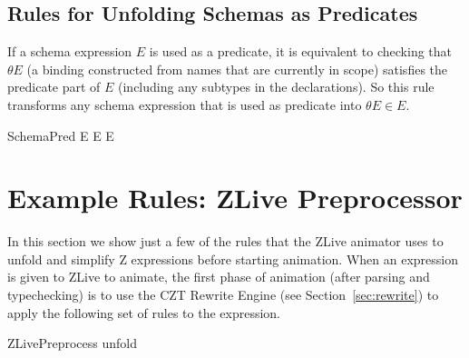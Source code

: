 \documentclass{entcs}
\newcommand{\sexprUnfoldsTo}{\mathrel{=_{se}}}
\newcommand{\schemaEquals}{\mathrel{=_S}}
\begin{document}
%


\subsection{Rules for Unfolding Schemas as Predicates}

If a schema expression $E$ is used as a predicate, it is equivalent to
checking that $\theta E$ (a binding constructed from names that are
currently in scope) satisfies the predicate part of $E$ (including any
subtypes in the declarations).  So this rule transforms any schema
expression that is used as predicate into $\theta E \in E$.
\begin{zedrule}{SchemaPred}
  E \iff \theta E \in E
\end{zedrule}

\section{Example Rules: ZLive Preprocessor} \label{sec:zlive}

In this section we show just a few of the rules that the ZLive
animator uses to unfold and simplify Z expressions before starting
animation.  When an expression is given to ZLive to animate, the first
phase of animation (after parsing and typechecking) is to use the CZT
Rewrite Engine (see Section~\ref{sec:rewrite}) to apply the following
set of rules to the expression.

\begin{zsection}
  \SECTION ZLivePreprocess \parents unfold
\end{zsection}
\end{document}
